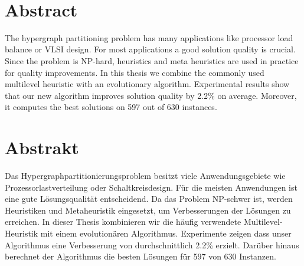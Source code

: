 \documentclass[a4paper,12pt,titlepage, BCOR7mm,headsepline]{scrbook}
\numberwithin{equation}{section}
\begin{document}

\ 
\newpage
\clearpage

\section*{Abstract}
The hypergraph partitioning problem has many applications like processor load balance or VLSI design.
For most applications a good solution quality is crucial. Since the problem is NP-hard, heuristics and meta heuristics are used in practice for quality improvements. In this thesis we combine the commonly used multilevel heuristic with an evolutionary algorithm. Experimental results show that our new algorithm improves solution quality by 2.2\% on average. Moreover, it computes the best solutions on 597 out of 630 instances.






\section*{Abstrakt}
Das Hypergraphpartitionierungsproblem besitzt viele Anwendungsgebiete wie Prozessorlastverteilung oder Schaltkreisdesign. Für die meisten Anwendungen ist eine gute Lösungsqualität entscheidend. Da das Problem NP-schwer ist, werden Heuristiken und Metaheuristik eingesetzt, um Verbesserungen der Lösungen zu erreichen.
In dieser Thesis kombinieren wir die häufig verwendete Multilevel-Heuristik mit einem evolutionären Algorithmus. Experimente zeigen dass unser Algorithmus eine Verbesserung von durchschnittlich 2.2\% erzielt. Darüber hinaus berechnet der Algorithmus die besten Lösungen für 597 von 630 Instanzen.
\end{document}
